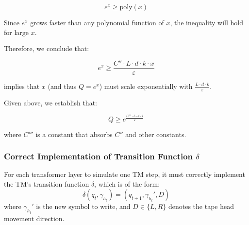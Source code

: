 {\[
e^{x} \geq \text{poly}(x)
\]

Since \( e^{x} \) grows faster than any polynomial function of \( x \), the inequality will hold for large \( x \).

Therefore, we conclude that:

\[
e^{x} \geq \frac{C'' \cdot L \cdot d \cdot k \cdot x}{\varepsilon}
\]

implies that \( x \) (and thus \( Q = e^{x} \)) must scale exponentially with \( \frac{L \cdot d \cdot k}{\varepsilon} \).

Given above, we establish that:

\[
Q \geq e^{\frac{C''' \cdot L \cdot d \cdot k}{\varepsilon}}
\]

where \( C''' \) is a constant that absorbs \( C'' \) and other constants.

}

\subsubsection{Correct Implementation of Transition Function \( \delta \)}

For each transformer layer to simulate one TM step, it must correctly implement the TM’s transition function \( \delta \), which is of the form:
\[
\delta(q_t, \gamma_{h_t}) = (q_{t+1}, \gamma_{h_t}', D)
\]
where \( \gamma_{h_t}' \) is the new symbol to write, and \( D \in \{L, R\} \) denotes the tape head movement direction.

